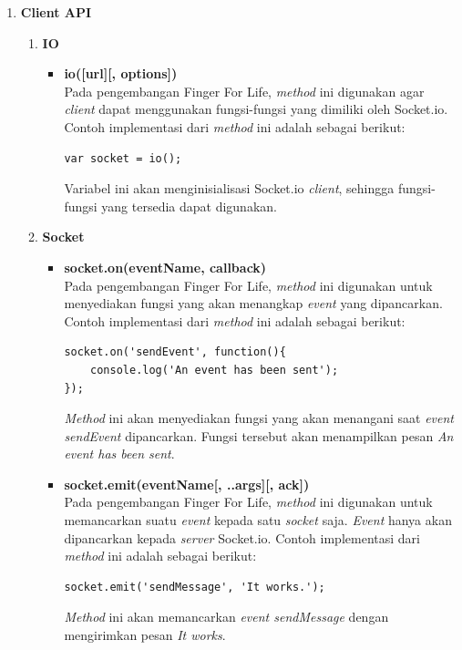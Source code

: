 \begin{enumerate}
\begin{enumerate}
\begin{enumerate}
\begin{itemize}
			\end{itemize}
		\end{enumerate}
	
		
		\item \textbf{Client API} \\
		\begin{enumerate}
			\item \textbf{IO}
			\begin{itemize}
				\item \textbf{io([url][, options])} \\
				Pada pengembangan Finger For Life, \textit{method} ini digunakan agar \textit{client} dapat menggunakan fungsi-fungsi yang dimiliki oleh Socket.io. Contoh implementasi dari \textit{method} ini adalah sebagai berikut:
\begin{lstlisting}
var socket = io();
\end{lstlisting}
				Variabel ini akan menginisialisasi Socket.io \textit{client}, sehingga fungsi-fungsi yang tersedia dapat digunakan.

			\end{itemize}
		
			\item \textbf{Socket}
			\begin{itemize}
				\item \textbf{socket.on(eventName, callback)} \\
				Pada pengembangan Finger For Life, \textit{method} ini digunakan untuk menyediakan fungsi yang akan menangkap \textit{event} yang dipancarkan. Contoh implementasi dari \textit{method} ini adalah sebagai berikut:
\begin{lstlisting}
socket.on('sendEvent', function(){
	console.log('An event has been sent');
});
\end{lstlisting}
\textit{Method} ini akan menyediakan fungsi yang akan menangani saat \textit{event sendEvent} dipancarkan. Fungsi tersebut akan menampilkan pesan \textit{An event has been sent}.
				
				\item \textbf{socket.emit(eventName[, ..args][, ack])} \\
				Pada pengembangan Finger For Life, \textit{method} ini digunakan untuk memancarkan suatu \textit{event} kepada satu \textit{socket} saja. \textit{Event} hanya akan dipancarkan kepada \textit{server} Socket.io. Contoh implementasi dari \textit{method} ini adalah sebagai berikut:
\begin{lstlisting}
socket.emit('sendMessage', 'It works.');
\end{lstlisting}
\textit{Method} ini akan memancarkan \textit{event sendMessage} dengan mengirimkan pesan \textit{It works}.
			\end{itemize}
			

\end{enumerate}
\end{enumerate}
\end{enumerate}
